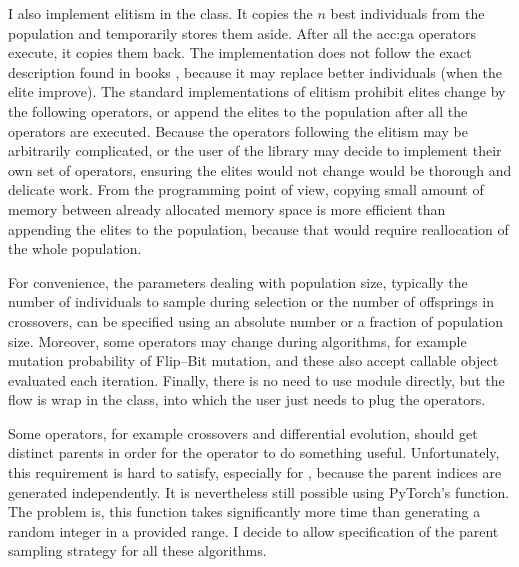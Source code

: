 I also implement elitism in the  class. It copies the $n$ best individuals from the population and temporarily stores them aside. After all the \acrshort{acc:ga} operators execute, it copies them back. The implementation does not follow the exact description found in books \citep{IntroductionToEA}, because it may replace better individuals (when the elite improve). The standard implementations of elitism prohibit elites change by the following operators, or append the elites to the population after all the operators are executed. Because the operators following the elitism may be arbitrarily complicated, or the user of the library may decide to implement their own set of operators, ensuring the elites would not change would be thorough and delicate work. From the \gpu programming point of view, copying small amount of memory between already allocated memory space is more efficient than appending the elites to the population, because that would require reallocation of the whole population.

For convenience, the parameters dealing with population size, typically the number of individuals to sample during selection or the number of offsprings in crossovers, can be specified using an absolute number or a fraction of population size. Moreover, some operators may change during algorithms, for example mutation probability of Flip--Bit mutation, and these also accept callable object evaluated each iteration. Finally, there is no need to use  module directly, but the flow is wrap in the  class, into which the user just needs to plug the operators.

Some operators, for example crossovers and differential evolution, should get distinct parents in order for the operator to do something useful. Unfortunately, this requirement is hard to satisfy, especially for \gpuns, because the parent indices are generated independently. It is nevertheless still possible using PyTorch's  function. The problem is, this function takes significantly more time than generating a random integer in a provided range. I decide to allow specification of the parent sampling strategy for all these algorithms.

